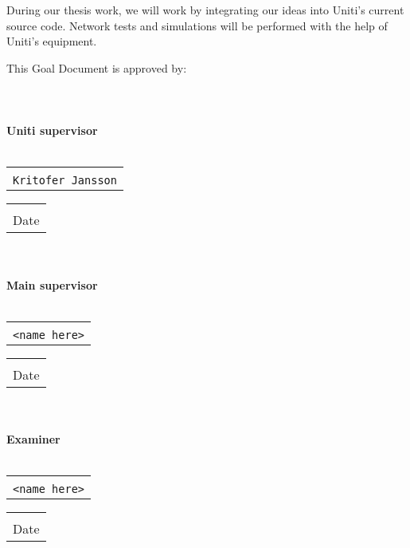 \documentclass[a4paper]{article}
\makeatletter
\newcommand{\signature}[2]{%
	\noindent%
	\textbf{{#1}}\\\\
	\begin{tabular}{@{}p{2.5in}@{}}
		\\ \hline \\[-.75\normalbaselineskip]
		\texttt{{#2}}
	\end{tabular} \hspace{0in}
	\begin{tabular}{@{}p{2.5in}@{}}
		\\ \hline \\[-.75\normalbaselineskip]
		Date
	\end{tabular}\\
}
\makeatother
\begin{document}
During our thesis work, we will work by integrating our ideas into Uniti's
current source code.
Network tests and simulations will be performed with the help of Uniti's
equipment.



{}



This Goal Document is approved by:\\\\\\\\

\signature{Uniti supervisor}{Kritofer Jansson}\\

\signature{Main supervisor}{<name here>}\\

\signature{Examiner}{<name here>}
\end{document}
